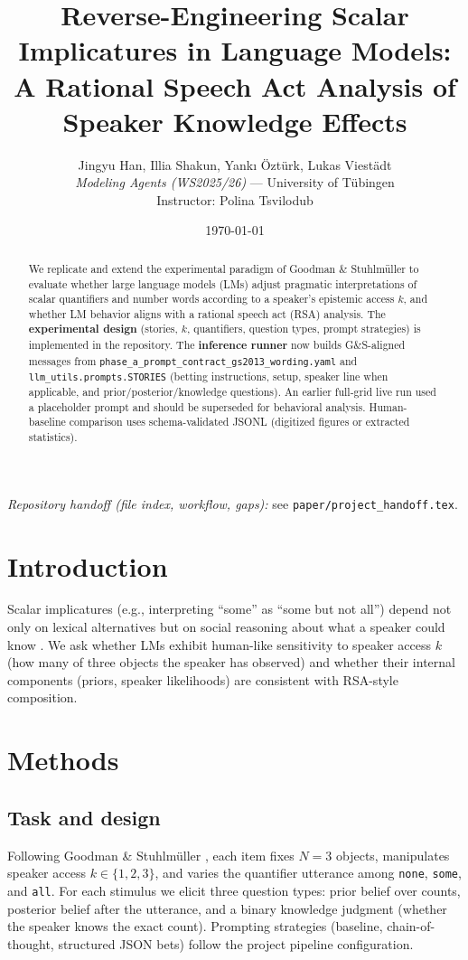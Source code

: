 \documentclass[11pt]{article}
\title{Reverse-Engineering Scalar Implicatures in Language Models:\\
A Rational Speech Act Analysis of Speaker Knowledge Effects}
\author{Jingyu Han, Illia Shakun, Yank{\i} \"{O}zt\"{u}rk, Lukas Viest\"{a}dt \\
\textit{Modeling Agents (WS2025/26)} --- University of T\"{u}bingen \\
Instructor: Polina Tsvilodub}
\date{\today}
\begin{document}
\maketitle

\begin{abstract}
We replicate and extend the experimental paradigm of Goodman \& Stuhlm\"{u}ller \cite{goodman2013knowledge} to evaluate whether large language models (LMs) adjust pragmatic interpretations of scalar quantifiers and number words according to a speaker's epistemic access $k$, and whether LM behavior aligns with a rational speech act (RSA) analysis. The \textbf{experimental design} (stories, $k$, quantifiers, question types, prompt strategies) is implemented in the repository. The \textbf{inference runner} now builds G\&S-aligned messages from \texttt{phase\_a\_prompt\_contract\_gs2013\_wording.yaml} and \texttt{llm\_utils.prompts.STORIES} (betting instructions, setup, speaker line when applicable, and prior/posterior/knowledge questions). An earlier full-grid live run used a placeholder prompt and should be superseded for behavioral analysis. Human-baseline comparison uses schema-validated JSONL (digitized figures or extracted statistics).
\end{abstract}

\noindent\textit{Repository handoff (file index, workflow, gaps):} see \texttt{paper/project\_handoff.tex}.

\section{Introduction}
Scalar implicatures (e.g., interpreting ``some'' as ``some but not all'') depend not only on lexical alternatives but on social reasoning about what a speaker could know \cite{goodman2013knowledge}. We ask whether LMs exhibit human-like sensitivity to speaker access $k$ (how many of three objects the speaker has observed) and whether their internal components (priors, speaker likelihoods) are consistent with RSA-style composition.

\section{Methods}

\subsection{Task and design}
Following Goodman \& Stuhlm\"{u}ller \cite{goodman2013knowledge}, each item fixes $N{=}3$ objects, manipulates speaker access $k \in \{1,2,3\}$, and varies the quantifier utterance among \texttt{none}, \texttt{some}, and \texttt{all}. For each stimulus we elicit three question types: prior belief over counts, posterior belief after the utterance, and a binary knowledge judgment (whether the speaker knows the exact count). Prompting strategies (baseline, chain-of-thought, structured JSON bets) follow the project pipeline configuration.
\end{document}
